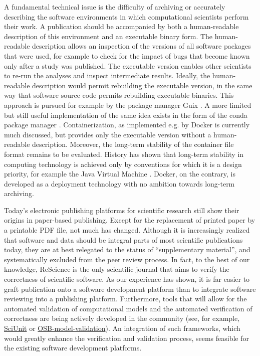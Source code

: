 \documentclass[a4paper,10pt, twocolumn]{article}
\begin{document}
A fundamental technical issue is the difficulty of archiving or
accurately describing the software environments in which computational
scientists perform their work. A publication should be accompanied by
both a human-readable description of this environment and an
executable binary form. The human-readable description allows an
inspection of the versions of all software packages that were used,
for example to check for the impact of bugs that become known only
after a study was published. The executable version enables other
scientists to re-run the analyses and inspect intermediate
results. Ideally, the human-readable description would permit
rebuilding the executable version, in the same way that software
source code permits rebuilding executable binaries. This approach is
pursued for example by the package manager Guix \citep{Courtes:2015}.
A more limited but still useful implementation of the same idea exists
in the form of the conda package manager
\citep{conda}. Containerization, as implemented e.g. by Docker
\citep{docker} is currently much discussed, but provides only the
executable version without a human-readable description. Moreover, the
long-term stability of the container file format remains to be
evaluated. History has shown that long-term stability in computing
technology is achieved only by conventions for which it is a design
priority, for example the Java Virtual Machine \citep{JVM}. Docker, on
the contrary, is developed as a deployment technology with no ambition
towards long-term archiving.


Today's electronic publishing platforms for scientific research still
show their origins in paper-based publishing. Except for the
replacement of printed paper by a printable PDF file, not much has
changed. Although it is increasingly realized that software and data
should be integral parts of most scientific publications today, they
are at best relegated to the status of ``supplementary material'', and
systematically excluded from the peer review process. In fact, to the
best of our knowledge, ReScience is the only scientific journal that
aims to verify the correctness of scientific software. As our
experience has shown, it is far easier to graft publication onto a
software development platform than to integrate software reviewing
into a publishing platform. Furthermore, tools that will allow for the automated
validation of computational models and the automated verification of correctness are being actively 
developed in the community (see, for example, 
\href{https://github.com/scidash/sciunit}{SciUnit} or 
\href{https://github.com/OpenSourceBrain/osb-model-validation}{OSB-model-validation}). 
An integration of such frameworks, which would greatly enhance the 
verification and validation process, seems feasible for the existing software 
development platforms.
\end{document}

